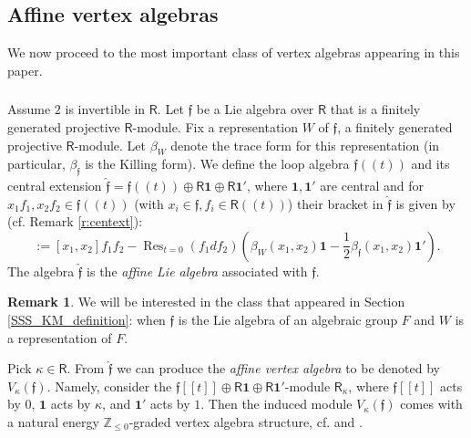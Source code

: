 \documentclass{amsart}
\theoremstyle{definition}
\newtheorem{Rem}[Thm]{Remark}
\newcommand{\sss}{\subsubsection{}}
\newcommand{\Ring}{\mathsf{R}}
\newcommand{\Z}{\mathbb{Z}}
\newcommand{\ff}{\mathfrak{f}}
\numberwithin{equation}{section}
\begin{document}
\subsection{Affine vertex algebras}\label{SS_affine_vertex}
We now proceed to the most important class of vertex algebras appearing in this paper. 

\sss \label{SSS_affine_VA_defn}
Assume $2$ is invertible in $\Ring$.
Let $\ff$ be a Lie algebra over $\Ring$ that is a finitely generated projective $\Ring$-module. Fix a representation $W$ of $\ff$, a finitely generated projective $\Ring$-module. Let $\beta_W$ denote the trace form for this representation (in particular, $\beta_{\ff}$ is the Killing form).  We define the loop algebra $\mathfrak{f}(\!(t)\!)$ and its central extension $\hat{\mathfrak{f}}=\mathfrak{f}((t))\oplus \Ring \mathbf{1}\oplus \Ring \mathbf{1}'$, where $\mathbf{1},\mathbf{1}'$ are central and for $x_1 f_1,x_2 f_2\in \mathfrak{f}(\!(t)\!)$ (with $x_i\in \mathfrak{f}, f_i\in \Ring(\!(t)\!)$) their bracket in $\hat{\mathfrak{f}}$ is given by (cf. Remark \ref{r:centext}):
\begin{equation}
[x_1 f_1,x_2f_2]:=[x_1,x_2]f_1f_2-\operatorname{Res}_{t=0}(f_1df_2)\left(\beta_W(x_1,x_2)\mathbf{1}-\frac{1}{2}\beta_{\ff}(x_1,x_2)\mathbf{1}'\right). 
\end{equation}
The algebra $\hat{\mathfrak{f}}$ is the {\it affine Lie algebra} associated with $\mathfrak{f}$. 

\begin{Rem}\label{Rem:general_setting}
We will be interested in the class that appeared in Section \ref{SSS_KM_definition}: when $\ff$ is the Lie algebra of an algebraic group $F$ and $W$ is a representation of $F$.  
\end{Rem}

Pick $\kappa\in \Ring$.
From $\hat{\mathfrak{f}}$ we can produce the {\it affine vertex algebra} to be denoted by 
$V_\kappa(\mathfrak{f})$. Namely, consider the $\mathfrak{f}[[t]]\oplus \Ring \mathbf{1}\oplus \Ring \mathbf{1}'$-module $\Ring_\kappa$, where $\mathfrak{f}[[t]]$ acts by $0$, $\mathbf{1}$ acts by $\kappa$, and $\mathbf{1}'$ acts by $1$. Then the induced module $V_\kappa(\mathfrak{f})$
comes with a natural energy $\Z_{\leqslant 0}$-graded vertex algebra structure, cf. \cite[Theorem 2.2.2]{Frenkel_loop} and \cite[Section 3.4]{ATV}.
\end{document}

